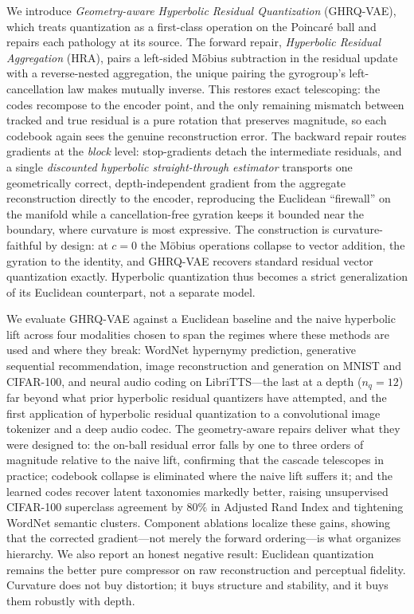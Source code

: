 \documentclass[12pt]{report}
\begin{document}
We introduce \emph{Geometry-aware Hyperbolic Residual Quantization} (GHRQ-VAE), which treats
quantization as a first-class operation on the Poincar\'e ball and repairs each pathology at
its source. The forward repair, \emph{Hyperbolic Residual Aggregation} (HRA), pairs a
left-sided M\"obius subtraction in the residual update with a reverse-nested aggregation, the
unique pairing the gyrogroup's left-cancellation law makes mutually inverse. This restores
exact telescoping: the codes recompose to the encoder point, and the only remaining mismatch
between tracked and true residual is a pure rotation that preserves magnitude, so each
codebook again sees the genuine reconstruction error. The backward repair routes gradients
at the \emph{block} level: stop-gradients detach the intermediate residuals, and a single
\emph{discounted hyperbolic straight-through estimator} transports one geometrically correct,
depth-independent gradient from the aggregate reconstruction directly to the encoder,
reproducing the Euclidean ``firewall'' on the manifold while a cancellation-free gyration
keeps it bounded near the boundary, where curvature is most expressive. The construction is
curvature-faithful by design: at $c=0$ the M\"obius operations collapse to vector addition,
the gyration to the identity, and GHRQ-VAE recovers standard residual vector quantization
exactly. Hyperbolic quantization thus becomes a strict generalization of its Euclidean
counterpart, not a separate model.

We evaluate GHRQ-VAE against a Euclidean baseline and the naive hyperbolic lift across four
modalities chosen to span the regimes where these methods are used and where they break:
WordNet hypernymy prediction, generative sequential recommendation, image reconstruction and
generation on MNIST and CIFAR-100, and neural audio coding on LibriTTS---the last at a depth
($n_q=12$) far beyond what prior hyperbolic residual quantizers have attempted, and the first
application of hyperbolic residual quantization to a convolutional image tokenizer and a deep
audio codec. The geometry-aware repairs deliver what they were designed to: the on-ball
residual error falls by one to three orders of magnitude relative to the naive lift,
confirming that the cascade telescopes in practice; codebook collapse is eliminated where the
naive lift suffers it; and the learned codes recover latent taxonomies markedly better,
raising unsupervised CIFAR-100 superclass agreement by $80\%$ in Adjusted Rand Index and
tightening WordNet semantic clusters. Component ablations localize these gains, showing that
the corrected gradient---not merely the forward ordering---is what organizes hierarchy. We
also report an honest negative result: Euclidean quantization remains the better pure
compressor on raw reconstruction and perceptual fidelity. Curvature does not buy
distortion; it buys structure and stability, and it buys them robustly with depth.
\end{document}
